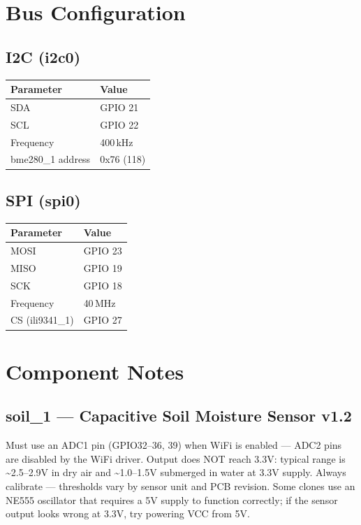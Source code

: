 \documentclass[a4paper,11pt]{article}
\begin{document}
\section{Bus Configuration}

\subsection{I2C (i2c0)}
\begin{tabular}{ll}
\toprule
\textbf{Parameter} & \textbf{Value} \\
\midrule
SDA & GPIO 21 \\
SCL & GPIO 22 \\
Frequency & 400\,kHz \\
\midrule
bme280\_1 address & 0x76 (118) \\
\bottomrule
\end{tabular}

\subsection{SPI (spi0)}
\begin{tabular}{ll}
\toprule
\textbf{Parameter} & \textbf{Value} \\
\midrule
MOSI & GPIO 23 \\
MISO & GPIO 19 \\
SCK  & GPIO 18 \\
Frequency & 40\,MHz \\
CS (ili9341\_1) & GPIO 27 \\
\bottomrule
\end{tabular}

\section{Component Notes}

\subsection{soil\_1 --- Capacitive Soil Moisture Sensor v1.2}

Must use an ADC1 pin (GPIO32--36, 39) when WiFi is enabled --- ADC2 pins are disabled by the WiFi driver. Output does NOT reach 3.3V: typical range is \~{}2.5--2.9V in dry air and \~{}1.0--1.5V submerged in water at 3.3V supply. Always calibrate --- thresholds vary by sensor unit and PCB revision. Some clones use an NE555 oscillator that requires a 5V supply to function correctly; if the sensor output looks wrong at 3.3V, try powering VCC from 5V.
\end{document}
